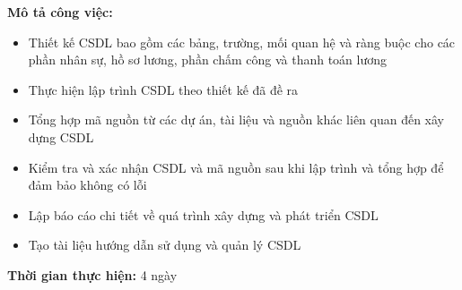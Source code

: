 {\begin{minipage}{\textwidth}
    \noindent \textbf{Mô tả công việc:}
    \begin{itemize}
        \item Thiết kế CSDL bao gồm các bảng, trường, mối quan hệ và ràng buộc cho các phần nhân sự, hồ sơ lương, phần chấm công và thanh toán lương
        \item Thực hiện lập trình CSDL theo thiết kế đã đề ra
        \item Tổng hợp mã nguồn từ các dự án, tài liệu và nguồn khác liên quan đến xây dựng CSDL
        \item Kiểm tra và xác nhận CSDL và mã nguồn sau khi lập trình và tổng hợp để đảm bảo không có lỗi
        \item Lập báo cáo chi tiết về quá trình xây dựng và phát triển CSDL
        \item Tạo tài liệu hướng dẫn sử dụng và quản lý CSDL
    \end{itemize}
    \noindent \textbf{Thời gian thực hiện:} 4 ngày \\
    \end{minipage}
}
\newpage
